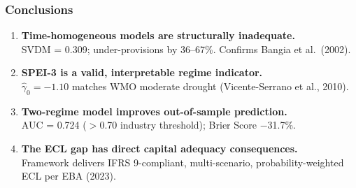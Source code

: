 \documentclass{beamer}
\begin{document}
\begin{frame}
    \frametitle{Conclusions}
    \begin{enumerate}
        \item \textbf{Time-homogeneous models are structurally inadequate.}\\
              SVDM = 0.309; under-provisions by 36--67\%. Confirms Bangia et al.\ (2002).
        \item \textbf{SPEI-3 is a valid, interpretable regime indicator.}\\
              $\hat{\gamma}_0 = -1.10$ matches WMO moderate drought (Vicente-Serrano et al., 2010).
        \item \textbf{Two-regime model improves out-of-sample prediction.}\\
              AUC = 0.724 ($>$0.70 industry threshold); Brier Score $-$31.7\%.
        \item \textbf{The ECL gap has direct capital adequacy consequences.}\\
              Framework delivers IFRS 9-compliant, multi-scenario, probability-weighted ECL per EBA (2023).
    \end{enumerate}
\end{frame}
\end{document}
